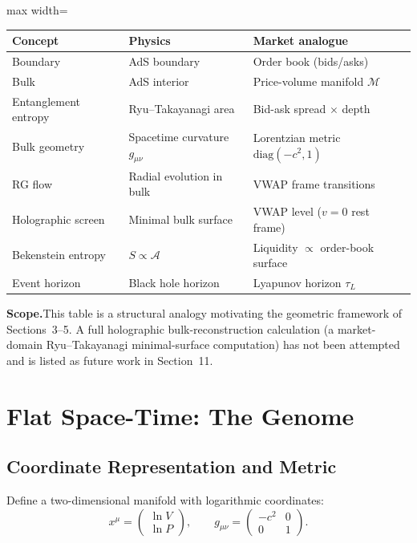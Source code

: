\documentclass[12pt,a4paper]{article}
\begin{document}
\begin{center}
\begin{adjustbox}{max width=\textwidth}
\begin{tabular}{lll}
\toprule
Concept & Physics & Market analogue \\
\midrule
Boundary & AdS boundary & Order book (bids/asks) \\
Bulk & AdS interior & Price-volume manifold $\mathcal{M}$ \\
Entanglement entropy & Ryu--Takayanagi area & Bid-ask spread $\times$ depth \\
Bulk geometry & Spacetime curvature $g_{\mu\nu}$ & Lorentzian metric $\text{diag}(-c^2,1)$ \\
RG flow & Radial evolution in bulk & VWAP frame transitions \\
Holographic screen & Minimal bulk surface & VWAP level ($v=0$ rest frame) \\
Bekenstein entropy & $S \propto \mathcal{A}$ & Liquidity $\propto$ order-book surface \\
Event horizon & Black hole horizon & Lyapunov horizon $\tau_L$ \\
\bottomrule
\end{tabular}
\end{adjustbox}
\end{center}

\textbf{Scope.}\quad This table is a structural analogy motivating the
geometric framework of Sections~3--5. A full holographic
bulk-reconstruction calculation (a market-domain Ryu--Takayanagi
minimal-surface computation) has not been attempted and is listed as
future work in Section~11.


\section{Flat Space-Time: The Genome}

\subsection{Coordinate Representation and Metric}

Define a two-dimensional manifold with logarithmic coordinates:
\begin{equation}
    x^\mu = \begin{pmatrix} \ln V \\ \ln P \end{pmatrix}, \qquad
    g_{\mu\nu} = \begin{pmatrix} -c^2 & 0 \\ 0 & 1 \end{pmatrix}.
\end{equation}
\end{document}
